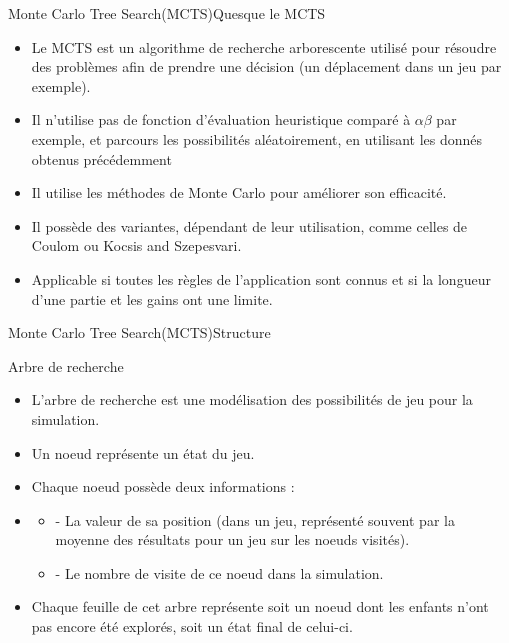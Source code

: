 \begin{frame}{Monte Carlo Tree Search(MCTS)}{Quesque le MCTS}
	\begin{block}{}
		\begin{itemize}
			\item Le MCTS est un algorithme de recherche arborescente utilisé pour résoudre des problèmes afin de prendre une décision (un déplacement dans un jeu par exemple).
			\item Il n'utilise pas de fonction d'évaluation heuristique comparé à $\alpha$$\beta$ par exemple, et parcours les possibilités aléatoirement, en utilisant les donnés obtenus précédemment			\item Il utilise les méthodes de Monte Carlo pour améliorer son efficacité.
			\item Il possède des variantes, dépendant de leur utilisation, comme celles de Coulom ou Kocsis and Szepesvari.
			\item Applicable si toutes les règles de l'application sont connus et si la longueur d'une partie et les gains ont une limite.	
		\end{itemize}
	\end{block}
\end{frame}

\begin{frame}{Monte Carlo Tree Search(MCTS)}{Structure}
	\begin{block}{Arbre de recherche}
		\begin{itemize}
			\item L'arbre de recherche est une modélisation des possibilités de jeu pour la simulation.
			\item Un noeud représente un état du jeu.
			\item Chaque noeud possède deux informations :
			\item\begin{itemize}
				\item - La valeur de sa position (dans un jeu, représenté souvent par la moyenne des résultats pour un jeu sur les noeuds visités).
				\item - Le nombre de visite de ce noeud dans la simulation.
			\end{itemize}
			\item Chaque feuille de cet arbre représente soit un noeud dont les enfants n'ont pas encore été explorés, soit un état final de celui-ci.		
		\end{itemize}
	\end{block}
\end{frame}

